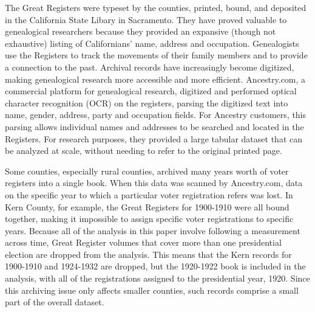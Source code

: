 \documentclass[11pt]{scrartcl}\usepackage[]{graphicx}\usepackage[]{color}
\begin{document}
The Great Registers were typeset by the counties, printed, bound, and deposited in the California State Libary in Sacramento. They have proved valuable to genealogical researchers because they provided an expansive (though not exhaustive) listing of Californians' name, address and occupation. Genealogists use the Registers to track the movements of their family members and to provide a connection to the past.  Archival records have increasingly become digitized, making genealogical research more accessible and more efficient.  Ancestry.com, a  commercial platform for genealogical research, digitized and performed optical character recognition (OCR) on the registers, parsing the digitized text into name, gender, address, party and occupation fields. For Ancestry customers, this parsing allows individual names and addresses to be searched and located in the Registers.  For research purposes, they provided a large tabular dataset that can be analyzed at scale, without needing to refer to the original printed page.  

Some counties, especially rural counties, archived many years worth of voter registers into a single book. When this data was scanned by Ancestry.com, data on the specific year to which a particular voter registration refers was lost. In Kern County, for example, the Great Registers for 1900-1910 were all bound together, making it impossible to assign specific voter registrations to specific years. Because all of the analysis in this paper involve following a measurement across time, Great Register volumes that cover more than one presidential election are dropped from the analysis.  This means that the Kern records for 1900-1910 and 1924-1932 are dropped, but the 1920-1922 book is included in the analysis, with all of the registrations assigned to the presidential year, 1920. Since this archiving issue only affects smaller counties, such records comprise a small part of the overall dataset. 


\end{document}
